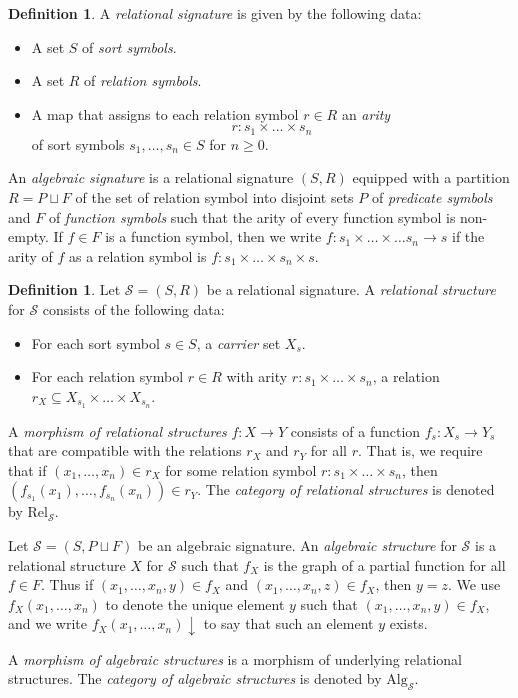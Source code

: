\documentclass[a4paper]{article}
\theoremstyle{remark}
\theoremstyle{definition}
\newtheorem{definition}[theorem]{Definition}
\begin{document}
\begin{definition}
  A \emph{relational signature} is given by the following data:
  \begin{itemize}
    \item
      A set $S$ of \emph{sort symbols}.
    \item
      A set $R$ of \emph{relation symbols}.
    \item
      A map that assigns to each relation symbol $r \in R$ an \emph{arity}
      \begin{equation}
        r : s_1 \times \dots \times s_n
      \end{equation}
      of sort symbols $s_1, \dots, s_n \in S$ for $n \geq 0$.
  \end{itemize}
  
  An \emph{algebraic signature} is a relational signature $(S, R)$ equipped with a partition $R = P \sqcup F$ of the set of relation symbol into disjoint sets $P$ of \emph{predicate symbols} and $F$ of \emph{function symbols} such that the arity of every function symbol is non-empty.
  If $f \in F$ is a function symbol, then we write $f : s_1 \times \dots \times \dots s_n \rightarrow s$ if the arity of $f$ as a relation symbol is $f : s_1 \times \dots \times s_n \times s$.
\end{definition}

\begin{definition}
  Let $\mathcal{S} = (S, R)$ be a relational signature.
  A \emph{relational structure} for $\mathcal{S}$ consists of the following data:
  \begin{itemize}
    \item
      For each sort symbol $s \in S$, a \emph{carrier} set $X_s$.
    \item
      For each relation symbol $r \in R$ with arity $r : s_1 \times \dots \times s_n$, a relation $r_X \subseteq X_{s_1} \times \dots \times X_{s_n}$.
  \end{itemize}

  A \emph{morphism of relational structures} $f : X \rightarrow Y$  consists of a function $f_s : X_s \rightarrow Y_s$ that are compatible with the relations $r_X$ and $r_Y$ for all $r$.
  That is, we require that if $(x_1, \dots, x_n) \in r_X$ for some relation symbol $r : s_1 \times \dots \times s_n$, then $(f_{s_1}(x_1), \dots, f_{s_n}(x_n)) \in r_Y$.
  The \emph{category of relational structures} is denoted by $\mathrm{Rel}_\mathcal{S}$.

  Let $\mathcal{S} = (S, P \sqcup F)$ be an algebraic signature.
  An \emph{algebraic structure} for $\mathcal{S}$ is a relational structure $X$ for $\mathcal{S}$ such that $f_X$ is the graph of a partial function for all $f \in F$.
  Thus if $(x_1, \dots, x_n, y) \in f_X$ and $(x_1, \dots, x_n, z) \in f_X$, then $y = z$.
  We use $f_X(x_1, \dots, x_n)$ to denote the unique element $y$
 such that $(x_1, \dots, x_n, y) \in f_X$, and we write $f_X(x_1, \dots, x_n) \downarrow$ to say that such an element $y$ exists.

  A \emph{morphism of algebraic structures} is a morphism of underlying relational structures.
  The \emph{category of algebraic structures} is denoted by $\mathrm{Alg}_\mathcal{S}$.
\end{definition}
\end{document}
